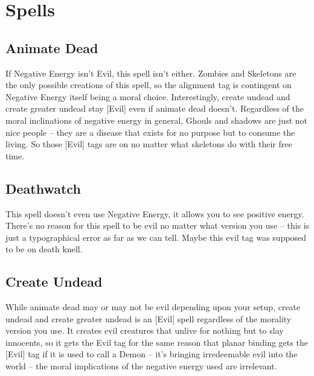 \section{Spells}

\subsection{Animate Dead} If Negative Energy isn't Evil, this spell isn't either. Zombies and Skeletons are the only possible creations of this spell, so the alignment tag is contingent on Negative Energy itself being a moral choice. Interestingly, create undead and create greater undead stay [Evil] even if animate dead doesn't. Regardless of the moral inclinations of negative energy in general, Ghouls and shadows are just not nice people -- they are a disease that exists for no purpose but to consume the living. So those [Evil] tags are on no matter what skeletons do with their free time.

\subsection{Deathwatch} This spell doesn't even use Negative Energy, it allows you to see positive energy. There's no reason for this spell to be evil no matter what version you use -- this is just a typographical error as far as we can tell. Maybe this evil tag was supposed to be on death knell.

\subsection{Create Undead} While animate dead may or may not be evil depending upon your setup, create undead and create greater undead is an [Evil] spell regardless of the morality version you use. It creates evil creatures that unlive for nothing but to slay innocents, so it gets the Evil tag for the same reason that planar binding gets the [Evil] tag if it is used to call a Demon -- it's bringing irredeemable evil into the world -- the moral implications of the negative energy used are irrelevant.

